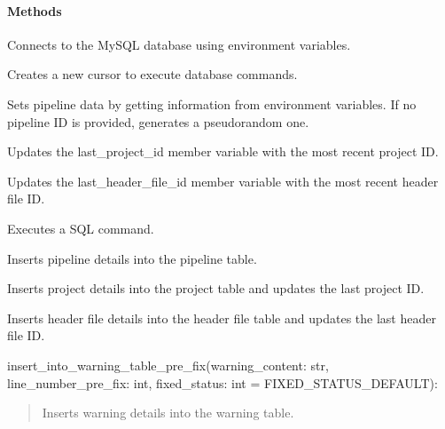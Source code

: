 \documentclass[letterpaper,10pt,english]{sphinxmanual}
\begin{document}
\begin{fulllineitems}
\begin{description}
\end{description}


\paragraph{Methods}
\label{\detokenize{main.db_operations:methods}}\begin{description}
\sphinxAtStartPar
Connects to the MySQL database using environment variables.

\sphinxAtStartPar
Creates a new cursor to execute database commands.

\sphinxAtStartPar
Sets pipeline data by getting information from environment variables. If no pipeline ID is
provided, generates a pseudo\sphinxhyphen{}random one.

\sphinxAtStartPar
Updates the last\_project\_id member variable with the most recent project ID.

\sphinxAtStartPar
Updates the last\_header\_file\_id member variable with the most recent header file ID.

\sphinxAtStartPar
Executes a SQL command.

\sphinxAtStartPar
Inserts pipeline details into the pipeline table.

\sphinxAtStartPar
Inserts project details into the project table and updates the last project ID.

\sphinxAtStartPar
Inserts header file details into the header file table and updates the last header file ID.

\end{description}

\sphinxAtStartPar
insert\_into\_warning\_table\_pre\_fix(warning\_content: str, line\_number\_pre\_fix: int, fixed\_status: int =
FIXED\_STATUS\_DEFAULT):
\begin{quote}

\sphinxAtStartPar
Inserts warning details into the warning table.
\end{quote}


\end{fulllineitems}
\end{document}
